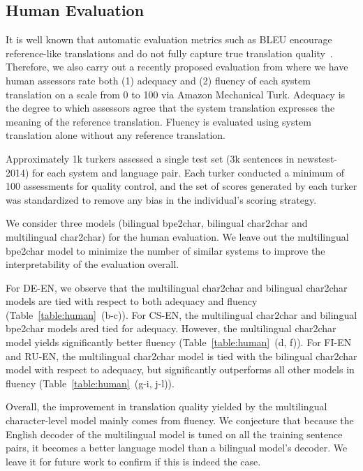 \documentclass[11pt,letterpaper]{article}
\newcommand{\nrr}{\color{black}}
\begin{document}
    \subsection{Human Evaluation}

    It {\nrr is} well known that automatic evaluation metrics such as BLEU encourage reference-like translations and do not fully capture true translation quality~\cite{Callison-Burch:09,Graham:15}. Therefore, we also carry out a recently proposed evaluation from \cite{Graham:16} where we have human assessors rate both (1) adequacy and (2) fluency of each system translation on a scale from 0 to 100 via {\nrr Amazon Mechanical Turk}. Adequacy is the degree to which assessors agree that the system translation expresses the meaning of the reference translation. Fluency is evaluated using system translation alone without any reference translation. 
    
    {\nrr Approximately 1k turkers assessed a single test set (3k sentences in newstest-2014) for each system and language pair. Each turker conducted a minimum of 100 assessments for quality control, and the set of scores generated by each turker was standardized to remove any bias in the individual's scoring strategy.}

    We consider three models (bilingual bpe2char, bilingual char2char and multilingual char2char) for the human evaluation. We leave out the multilingual bpe2char model to minimize the number of similar systems to improve the interpretability of the evaluation overall.

    For DE-EN, we observe that the multilingual char2char and bilingual char2char models are tied with respect to both adequacy and fluency (Table~\ref{table:human}~(b-c)). For CS-EN, the multilingual char2char and bilingual bpe2char models ared tied for adequacy. However, the multilingual char2char model yields significantly better fluency (Table~\ref{table:human}~(d, f)). For FI-EN and RU-EN, the multilingual char2char model is tied with the bilingual char2char model with respect to adequacy, but significantly outperforms all other models in fluency (Table~\ref{table:human}~(g-i, j-l)). 
    
    Overall, the improvement in translation quality yielded by the multilingual character-level model mainly comes from fluency. We conjecture that because the English decoder of the multilingual model is tuned on all the training sentence pairs, it becomes a better language model than a bilingual model's decoder. We leave it for future work to confirm if this is indeed the case.
\end{document}
